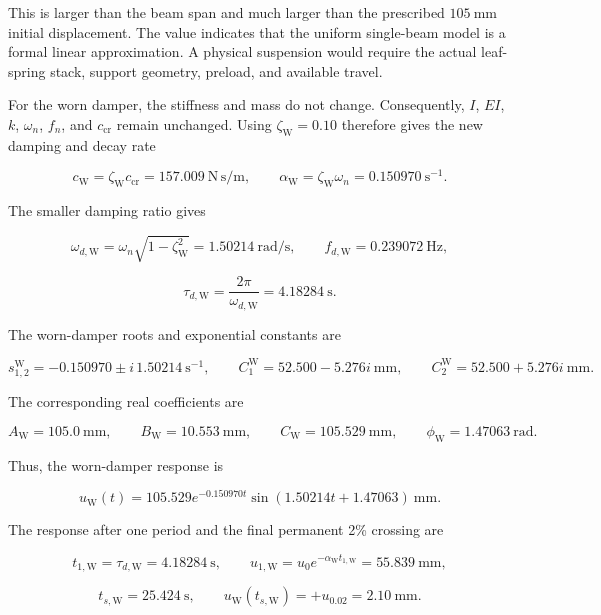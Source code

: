 This is larger than the beam span and much larger than the prescribed $105\ \mathrm{mm}$ initial displacement. The value indicates that the uniform single-beam model is a formal linear approximation. A physical suspension would require the actual leaf-spring stack, support geometry, preload, and available travel.

For the worn damper, the stiffness and mass do not change. Consequently, $I$, $EI$, $k$, $\omega_n$, $f_n$, and $c_{\mathrm{cr}}$ remain unchanged. Using $\zeta_{\mathrm{W}}=0.10$ therefore gives the new damping and decay rate

\[
c_{\mathrm{W}}=\zeta_{\mathrm{W}}c_{\mathrm{cr}}=157.009\ \mathrm{N\,s/m},
\qquad
\alpha_{\mathrm{W}}=\zeta_{\mathrm{W}}\omega_n=0.150970\ \mathrm{s^{-1}}.
\]

The smaller damping ratio gives

\[
\omega_{d,\mathrm{W}}=\omega_n\sqrt{1-\zeta_{\mathrm{W}}^2}=1.50214\ \mathrm{rad/s},
\qquad
f_{d,\mathrm{W}}=0.239072\ \mathrm{Hz},
\]

\[
\tau_{d,\mathrm{W}}=\frac{2\pi}{\omega_{d,\mathrm{W}}}=4.18284\ \mathrm{s}.
\]

The worn-damper roots and exponential constants are

\[
s_{1,2}^{\mathrm{W}}=-0.150970\pm i\,1.50214\ \mathrm{s^{-1}},
\qquad
C_1^{\mathrm{W}}=52.500-5.276i\ \mathrm{mm},
\qquad
C_2^{\mathrm{W}}=52.500+5.276i\ \mathrm{mm}.
\]

The corresponding real coefficients are

\[
A_{\mathrm{W}}=105.0\ \mathrm{mm},
\qquad
B_{\mathrm{W}}=10.553\ \mathrm{mm},
\qquad
C_{\mathrm{W}}=105.529\ \mathrm{mm},
\qquad
\phi_{\mathrm{W}}=1.47063\ \mathrm{rad}.
\]

Thus, the worn-damper response is

\[
u_{\mathrm{W}}(t)=105.529e^{-0.150970t}\sin(1.50214t+1.47063)\ \mathrm{mm}.
\]

The response after one period and the final permanent 2\% crossing are

\[
t_{1,\mathrm{W}}=\tau_{d,\mathrm{W}}=4.18284\ \mathrm{s},
\qquad
u_{1,\mathrm{W}}=u_0e^{-\alpha_{\mathrm{W}}t_{1,\mathrm{W}}}=55.839\ \mathrm{mm},
\]

\[
t_{s,\mathrm{W}}=25.424\ \mathrm{s},
\qquad
u_{\mathrm{W}}(t_{s,\mathrm{W}})=+u_{0.02}=2.10\ \mathrm{mm}.
\]

